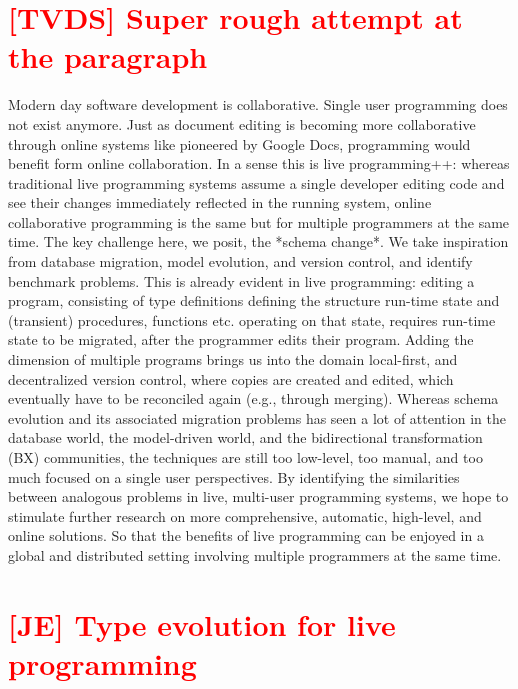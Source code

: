 \documentclass[english,submission]{programming}
\begin{document}
%
%
\printbibliography


\appendix

\section{\textcolor{red}{[TVDS] Super rough attempt at the paragraph}}

Modern day software development is collaborative. Single user programming does not exist anymore.
Just as document editing is becoming more collaborative through online systems like pioneered by Google Docs,
programming would benefit form online collaboration. In a sense this is live programming++: whereas traditional
live programming systems assume a single developer editing code and see their changes immediately reflected
in the running system, online collaborative programming is the same but for multiple programmers at the same time.
The key challenge here, we posit, the *schema change*. We take inspiration from database migration,
model evolution, and version control, and identify benchmark problems. This is already evident in live programming:
editing a program, consisting of type definitions defining the structure run-time state and (transient) procedures, functions
etc. operating on that state, requires run-time state to be migrated, after the programmer edits their program.
Adding the dimension of multiple programs brings us into the domain local-first, and decentralized version control, where
copies are created and edited, which eventually have to be reconciled again (e.g., through merging).
Whereas schema evolution and its associated migration problems has seen a lot of attention in the database world,
the model-driven world, and the bidirectional transformation (BX) communities, the techniques are still too low-level,
too manual, and too much focused on a single user perspectives. By identifying the similarities between analogous
problems in live, multi-user programming systems, we hope to stimulate further research on more comprehensive, automatic,
high-level, and online solutions. So that the benefits of live programming can be enjoyed in a global and distributed setting
involving multiple programmers at the same time.

\section{\textcolor{red}{[JE] Type evolution for live programming}}
\end{document}
